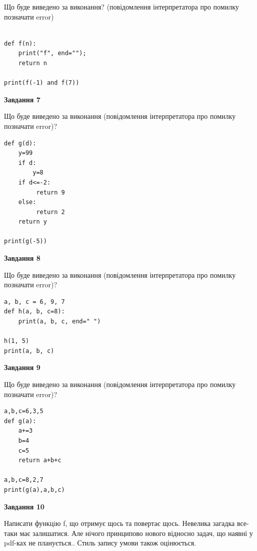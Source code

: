\documentclass[12pt, ukrainian]{article}
\begin{document}
{\begin {large}
Що буде виведено за виконання? (повідомлення інтерпретатора про помилку позначати error)\par
\begin{verbatim}

def f(n):
    print("f", end="");
    return n

print(f(-1) and f(7))
\end{verbatim}

{\begin {center}\textbf{Завдання 7}\end {center}}

Що буде виведено за виконання (повідомлення інтерпретатора про помилку позначати error)?\par
\begin{verbatim}
def g(d):
    y=99
    if d: 
        y=8
    if d<=-2:
         return 9
    else:
         return 2
    return y

print(g(-5))
\end{verbatim}

{\begin {center}\textbf{Завдання 8}\end {center}}

Що буде виведено за виконання (повідомлення інтерпретатора про помилку позначати error)?\par
\begin{verbatim}
a, b, c = 6, 9, 7
def h(a, b, c=8):
    print(a, b, c, end=" ")

h(1, 5)
print(a, b, c)
\end{verbatim}

{\begin {center}\textbf{Завдання 9}\end {center}}

Що буде виведено за виконання (повідомлення інтерпретатора про помилку позначати error)?\par
\begin{verbatim}
a,b,c=6,3,5
def g(a):
    a+=3
    b=4
    c=5
    return a+b+c

a,b,c=8,2,7
print(g(a),a,b,c)
\end{verbatim}

{\begin {center}\textbf{Завдання 10}\end {center}}


Написати функцiю f, що отримує щось та повертає щось. Невелика загадка все-таки має залишатися. Але нічого принципово нового відносно задач, що наявні у pdf-ках не планується.. Стиль запису умови також оцінюється.\par
\end {large}}
\newpage
\end{document}

